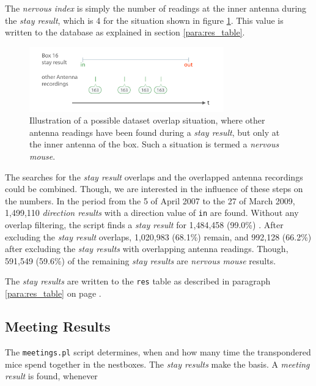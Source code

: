 The \textit{nervous index} is simply the number of readings at the inner antenna during the \textit{stay result}, which is 4 for the situation shown in figure \ref{fig:dataset_overlap_nervous}. This value is written to the database as explained in section \ref{para:res_table}.

\begin{figure}[htpb]
\begin{center}
  \includegraphics[width=0.75\textwidth]{assets/pdf/dataset_overlap_nervous_schema.pdf}
  \caption[Dataset overlap illustration]{Illustration of a possible dataset overlap situation, where other antenna readings have been found during a \textit{stay result}, but only at the inner antenna of the box. Such a situation is termed a \textit{nervous mouse}.}
  \label{fig:dataset_overlap_nervous}
\end{center}
\end{figure}

The searches for the \textit{stay result} overlaps and the overlapped antenna recordings could be combined. Though, we are interested in the influence of these steps on the numbers. In the period from the 5 of April 2007 to the 27 of March 2009, 1,499,110 \textit{direction results} with a direction value of \lstinline|in| are found. Without any overlap filtering, the script finds a \textit{stay result} for 1,484,458 (99.0\%) . After excluding the \textit{stay result} overlaps, 1,020,983 (68.1\%) remain, and 992,128 (66.2\%) after excluding the \textit{stay results} with overlapping antenna readings. Though, 591,549 (59.6\%) of the remaining \textit{stay results} are \textit{nervous mouse} results.

The \textit{stay results} are written to the \lstinline|res| table as described in paragraph \ref{para:res_table} on page \pageref{para:res_table}.

\subsection{Meeting Results}
\label{subsec:meetingres}

The \lstinline|meetings.pl| script determines, when and how many time the transpondered mice spend together in the nestboxes. The \textit{stay results} make the basis. A \textit{meeting result} is found, whenever

